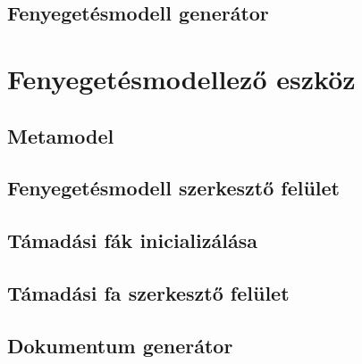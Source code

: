 \subsection{Fenyegetésmodell generátor}

\section{Fenyegetésmodellező eszköz}

\subsection{Metamodel}

\subsection{Fenyegetésmodell szerkesztő felület}

\subsection{Támadási fák inicializálása}

\subsection{Támadási fa szerkesztő felület}

\subsection{Dokumentum generátor}
